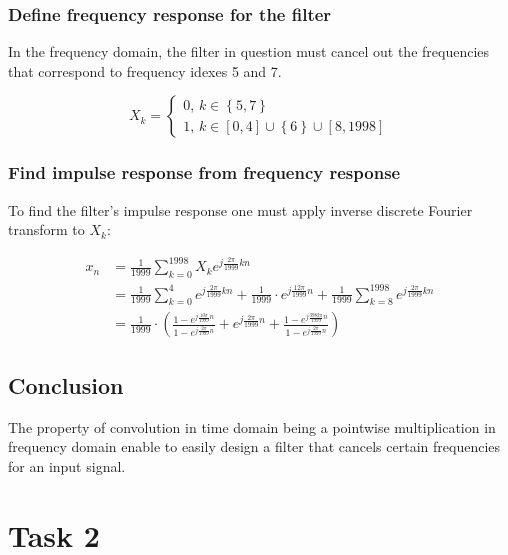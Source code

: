 \documentclass[a4paper]{article}
\theoremstyle{break}
\theoremstyle{break}
\begin{document}
\subsubsection*{Define frequency response for the filter}

In the frequency domain, the filter in question must cancel out the frequencies that correspond to frequency idexes 5 and 7.

\begin{equation*}
  X_k = \begin{cases}
          0, \, k \in \left\{ 5, 7 \right\} \\
          1, \, k \in [0, 4] \cup \left\{ 6 \right\} \cup [8, 1998]
        \end{cases}
\end{equation*}

\subsubsection*{Find impulse response from frequency response}

To find the filter's impulse response one must apply inverse discrete Fourier transform to $X_k$:

\begin{equation*}
  \begin{split}
    x_n &= \frac{1}{1999} \sum_{k=0}^{1998} X_k e^{j \frac{2 \pi }{1999} k n} \\
        &= \frac{1}{1999} \sum_{k=0}^{4} e^{j \frac{2 \pi }{1999} k n} + \frac{1}{1999} \cdot e^{j \frac{12 \pi }{1999} n} + \frac{1}{1999} \sum_{k=8}^{1998} e^{j \frac{2 \pi }{1999} k n} \\
        &= \frac{1}{1999} \cdot \left( \frac{1 - e^{j \frac{10 \pi}{1999} n}}{1 - e^{j \frac{2 \pi}{1999} n}} + e^{j \frac{2 \pi}{1999} n} + \frac{1 - e^{j \frac{3982 \pi}{1999} n}}{1 - e^{j \frac{2 \pi}{1999} n}} \right)
  \end{split}
\end{equation*}

\subsection*{Conclusion}

The property of convolution in time domain being a pointwise multiplication in frequency domain enable to easily design a filter that cancels certain frequencies for an input signal.

\clearpage
\section{Task 2}
\end{document}
